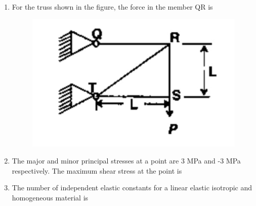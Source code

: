 \documentclass[journal,12pt,onecolumn]{IEEEtran}
\theoremstyle{remark}
\begin{document}
\begin{enumerate}
\begin{enumerate}
\end{enumerate}
\noindent\item For the truss shown in the figure, the force in the member QR is \hfill{}
\begin{figure}[H]
    \centering
    \includegraphics[scale=0.5]{figs/image1.jpg}
    \caption{}
    \label{fig:figure1}
\end{figure}
\begin{enumerate}
\end{enumerate}
\noindent\item The major and minor principal stresses at a point are 3 MPa and -3 MPa respectively. The maximum shear stress at the point is \hfill{}
\begin{enumerate}
\end{enumerate}
\noindent\item  The number of independent elastic constants for a linear elastic isotropic and homogeneous material is \hfill{}

\end{enumerate}
\end{document}
